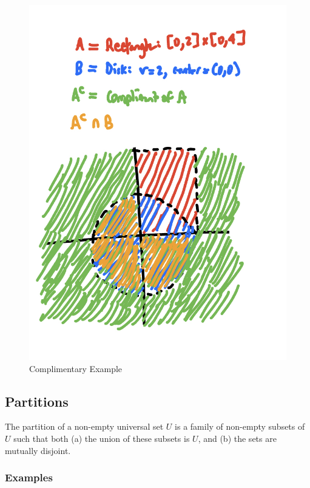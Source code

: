 \documentclass{article}
\begin{document}
\begin{figure}[!h]
    \centering
    \includegraphics[scale=0.25]{./compliment.jpeg}
    \caption{Complimentary Example}
    \label{fig:complimentary-example}
\end{figure}

\subsection{Partitions}

The partition of a non-empty universal set $U$ is a family of non-empty subsets of $U$ such that both (a) the union of these subsets is $U$, and (b) the sets are mutually disjoint.

\subsubsection{Examples}
\end{document}
